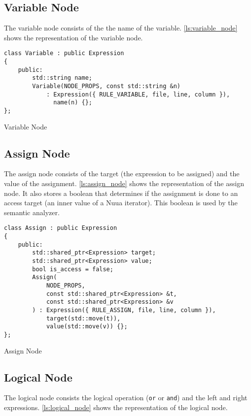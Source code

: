\subsection{Variable Node}

The variable node consists of the the name of the variable. \autoref{ls:variable_node} shows the representation of the variable node.

\begin{listing}[H]
\begin{verbatim}
class Variable : public Expression
{
    public:
        std::string name;
        Variable(NODE_PROPS, const std::string &n)
            : Expression({ RULE_VARIABLE, file, line, column }),
              name(n) {};
};
\end{verbatim}
\caption{Variable Node}
\label{ls:variable_node}
\end{listing}

\subsection{Assign Node}

The assign node consists of the target (the expression to be assigned) and the value of the assignment.
\autoref{ls:assign_node} shows the representation of the assign node. It also stores a boolean that determines if
the assignment is done to an access target (an inner value of a Nuua iterator). This boolean is used by the semantic analyzer.

\begin{listing}[H]
\begin{verbatim}
class Assign : public Expression
{
    public:
        std::shared_ptr<Expression> target;
        std::shared_ptr<Expression> value;
        bool is_access = false;
        Assign(
            NODE_PROPS,
            const std::shared_ptr<Expression> &t,
            const std::shared_ptr<Expression> &v
        ) : Expression({ RULE_ASSIGN, file, line, column }),
            target(std::move(t)),
            value(std::move(v)) {};
};
\end{verbatim}
\caption{Assign Node}
\label{ls:assign_node}
\end{listing}

\subsection{Logical Node}

The logical node consists the logical operation (\texttt{or} or \texttt{and}) and the left and right expressions.
\autoref{ls:logical_node} shows the representation of the logical node.

